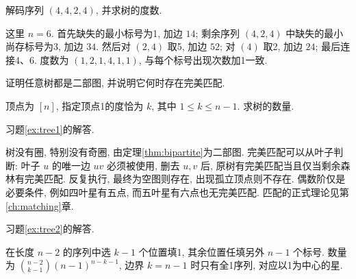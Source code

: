 \begin{example}
解码序列 $(4,4,2,4)$, 并求树的度数.
\end{example}
\begin{solution}
这里 $n=6$. 首先缺失的最小标号为1, 加边 $14$; 剩余序列 $(4,2,4)$ 中缺失的最小尚存标号为3, 加边 $34$. 然后对 $(2,4)$ 取5, 加边 $52$; 对 $(4)$ 取2, 加边 $24$; 最后连接4、6. 度数为 $(1,2,1,4,1,1)$, 与每个标号出现次数加1一致.
\end{solution}
\begin{exercise}\label{ex:tree1}
证明任意树都是二部图, 并说明它何时存在完美匹配.
\end{exercise}
\begin{exercise}\label{ex:tree2}
顶点为 $[n]$, 指定顶点1的度恰为 $k$, 其中 $1\le k\le n-1$. 求树的数量.
\end{exercise}
习题\ref{ex:tree1}的解答.
\begin{solution}
树没有圈, 特别没有奇圈, 由定理\ref{thm:bipartite}为二部图. 完美匹配可以从叶子判断: 叶子 $u$ 的唯一边 $uv$ 必须被使用, 删去 $u,v$ 后, 原树有完美匹配当且仅当剩余森林有完美匹配. 反复执行, 最终为空图则存在, 出现孤立顶点则不存在. 偶数阶仅是必要条件, 例如四叶星有五点, 而五叶星有六点也无完美匹配. 匹配的正式理论见第\ref{ch:matching}章.
\end{solution}
习题\ref{ex:tree2}的解答.
\begin{solution}
在长度 $n-2$ 的序列中选 $k-1$ 个位置填1, 其余位置任填另外 $n-1$ 个标号. 数量为 $\binom{n-2}{k-1}(n-1)^{n-k-1}$, 边界 $k=n-1$ 时只有全1序列, 对应以1为中心的星.
\end{solution}
